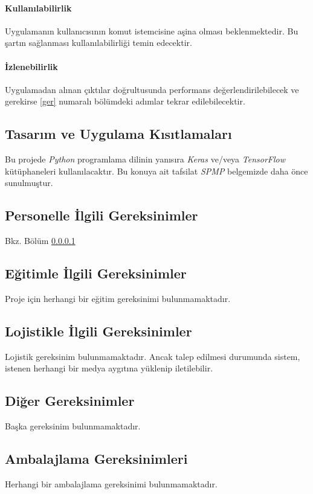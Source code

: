 \documentclass[12pt,a4paper]{article}
\begin{document}
   \paragraph{Kullanılabilirlik} \label{kullanilabilirlik}
   Uygulamanın kullanıcısının komut istemcisine aşina olması beklenmektedir. Bu şartın sağlanması kullanılabilirliği temin edecektir.

   \paragraph{İzlenebilirlik}
   Uygulamadan alınan çıktılar doğrultusunda performans değerlendirilebilecek ve gerekirse \ref{ger} numaralı bölümdeki adımlar tekrar edilebilecektir.

   \subsection{Tasarım ve Uygulama Kısıtlamaları}
   Bu projede \textit{Python} programlama dilinin yanısıra \textit{Keras} ve/veya \textit{TensorFlow} kütüphaneleri kullanılacaktır. Bu konuya ait tafsilat \textit{SPMP} belgemizde
   daha önce sunulmuştur.

   \subsection{Personelle İlgili Gereksinimler}
   Bkz. Bölüm \ref{kullanilabilirlik} 

   \subsection{Eğitimle İlgili Gereksinimler}
   Proje için herhangi bir eğitim gereksinimi bulunmamaktadır.

   \subsection{Lojistikle İlgili Gereksinimler}
   Lojistik gereksinim bulunmamaktadır. Ancak talep edilmesi durumunda sistem, istenen herhangi bir medya aygıtına yüklenip iletilebilir.

   \subsection{Diğer Gereksinimler}
   Başka gereksinim bulunmamaktadır.

   \subsection{Ambalajlama Gereksinimleri}
   Herhangi bir ambalajlama gereksinimi bulunmamaktadır.
\end{document}
